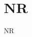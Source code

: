 \documentclass[\main/dresen_thesis.tex]{subfiles}
\begin{document}
  \section{NR}
    \label{app:methods:nr}
    NR
\end{document}
